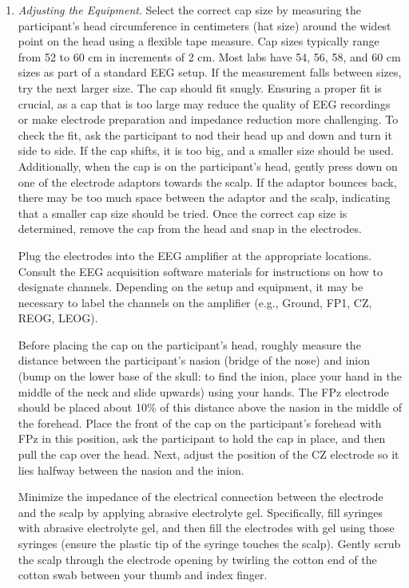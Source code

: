 \documentclass[journal,twocolumn]{IEEEtran}
\begin{document}
\begin{enumerate}
\item \emph{Adjusting the Equipment}.
Select the correct cap size by measuring the participant's head circumference in centimeters (hat size) around the widest point on the head using a flexible tape measure. Cap sizes typically range from 52 to 60 cm in increments of 2 cm. Most labs have 54, 56, 58, and 60 cm sizes as part of a standard EEG setup. If the measurement falls between sizes, try the next larger size. The cap should fit snugly. Ensuring a proper fit is crucial, as a cap that is too large may reduce the quality of EEG recordings or make electrode preparation and impedance reduction more challenging. To check the fit, ask the participant to nod their head up and down and turn it side to side. If the cap shifts, it is too big, and a smaller size should be used. Additionally, when the cap is on the participant’s head, gently press down on one of the electrode adaptors towards the scalp. If the adaptor bounces back, there may be too much space between the adaptor and the scalp, indicating that a smaller cap size should be tried. Once the correct cap size is determined, remove the cap from the head and snap in the electrodes.

Plug the electrodes into the EEG amplifier at the appropriate locations. Consult the EEG acquisition software materials for instructions on how to designate channels. Depending on the setup and equipment, it may be necessary to label the channels on the amplifier (e.g., Ground, FP1, CZ, REOG, LEOG).

Before placing the cap on the participant's head, roughly measure the distance between the participant's nasion (bridge of the nose) and inion (bump on the lower base of the skull: to find the inion, place your hand in the middle of the neck and slide upwards) using your hands. The FPz electrode should be placed about 10\% of this distance above the nasion in the middle of the forehead. Place the front of the cap on the participant's forehead with FPz in this position, ask the participant to hold the cap in place, and then pull the cap over the head. Next, adjust the position of the CZ electrode so it lies halfway between the nasion and the inion.

Minimize the impedance of the electrical connection between the electrode and the scalp by applying abrasive electrolyte gel. Specifically, fill syringes with abrasive electrolyte gel, and then fill the electrodes with gel using those syringes (ensure the plastic tip of the syringe touches the scalp). Gently scrub the scalp through the electrode opening by twirling the cotton end of the cotton swab between your thumb and index finger.


\end{enumerate}
\end{document}
